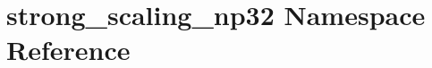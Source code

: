 \hypertarget{namespacestrong__scaling__np32}{}\section{strong\+\_\+scaling\+\_\+np32 Namespace Reference}
\label{namespacestrong__scaling__np32}
